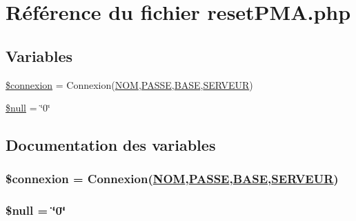 \hypertarget{resetPMA_8php}{
\section{R\'{e}f\'{e}rence du fichier reset\-PMA.php}
\label{resetPMA_8php}
}
\subsection*{Variables}
\begin{CompactItemize}
\item 
\hyperlink{resetPMA_8php_a0}{\$connexion} = Connexion(\hyperlink{pma__connect_8php_a0}{NOM},\hyperlink{pma__connect_8php_a1}{PASSE},\hyperlink{pma__connect_8php_a3}{BASE},\hyperlink{pma__connect_8php_a2}{SERVEUR})
\item 
\hyperlink{resetPMA_8php_a1}{\$null} = \char`\"{}0\char`\"{}
\end{CompactItemize}


\subsection{Documentation des variables}
\hypertarget{resetPMA_8php_a0}{
\subsubsection[\$connexion]{\setlength{\rightskip}{0pt plus 5cm}\$connexion = Connexion(\hyperlink{pma__connect_8php_a0}{NOM},\hyperlink{pma__connect_8php_a1}{PASSE},\hyperlink{pma__connect_8php_a3}{BASE},\hyperlink{pma__connect_8php_a2}{SERVEUR})}}
\label{resetPMA_8php_a0}


\hypertarget{resetPMA_8php_a1}{
\subsubsection[\$null]{\setlength{\rightskip}{0pt plus 5cm}\$null = \char`\"{}0\char`\"{}}}
\label{resetPMA_8php_a1}



